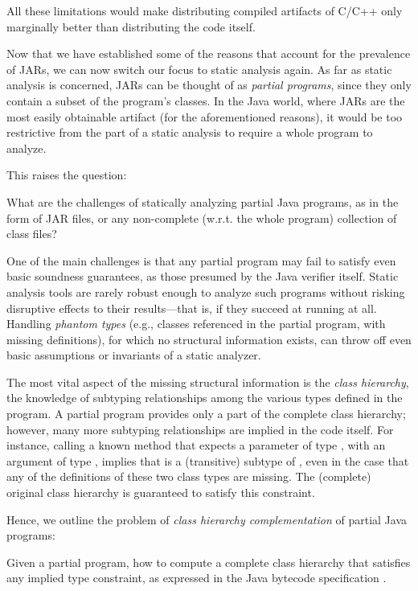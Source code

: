 All these limitations would make distributing compiled artifacts of
C/C++ only marginally better than distributing the code itself.

Now that we have established some of the reasons that account for the
prevalence of JARs, we can now switch our focus to static analysis
again. As far as static analysis is concerned, JARs can be thought of
as \emph{partial programs}, since they only contain a subset of the
program's classes. In the Java world, where JARs are the most easily
obtainable artifact (for the aforementioned reasons), it would be too
restrictive from the part of a static analysis to require a whole
program to analyze.

This raises the question:
\begin{displayquote}
  What are the challenges of statically analyzing partial Java
  programs, as in the form of JAR files, or any non-complete
  (w.r.t. the whole program) collection of class files?
\end{displayquote}

One of the main challenges is that any partial program may fail to
satisfy even basic soundness guarantees, as those presumed by the Java
verifier itself. Static analysis tools are rarely robust enough to
analyze such programs without risking disruptive effects to
their results---that is, if they succeed at running at all. Handling
\emph{phantom types} (e.g., classes referenced in the partial program,
with missing definitions), for which no structural information exists,
can throw off even basic assumptions or invariants of a static
analyzer.

The most vital aspect of the missing structural information is the
\emph{class hierarchy}, the knowledge of subtyping relationships among
the various types defined in the program. A partial program provides
only a part of the complete class hierarchy; however, many more
subtyping relationships are implied in the code itself. For instance,
calling a known method that expects a parameter of type , with
an argument of type , implies that  is a
(transitive) subtype of , even in the case that any of the
definitions of these two class types are missing. The (complete)
original class hierarchy is guaranteed to satisfy this
constraint.

Hence, we outline the problem of \emph{class hierarchy
  complementation} of partial Java programs:
\begin{displayquote}
  Given a partial program, how to compute a complete class hierarchy
  that satisfies any implied type constraint, as expressed in the Java
  bytecode specification \cite{Lindholm:1999:JVM:553607}.
\end{displayquote}

